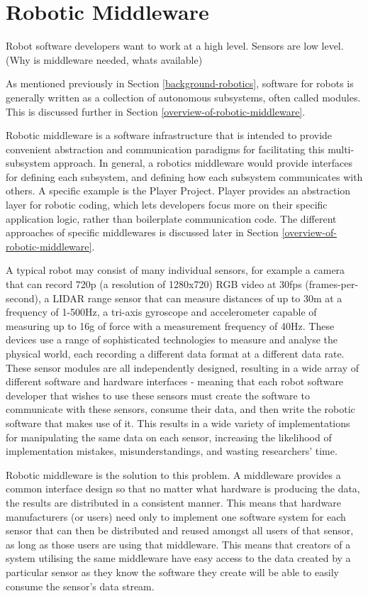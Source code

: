 \documentclass[../dissertation.tex]{subfiles}
\begin{document}
\section{Robotic Middleware}

Robot software developers want to work at a high level. Sensors are low level. (Why is middleware needed, whats available)

As mentioned previously in Section \ref{background-robotics}, software for robots is generally written as a collection of autonomous subsystems, often called modules. This is discussed further in Section \ref{overview-of-robotic-middleware}.

Robotic middleware is a software infrastructure that is intended to provide convenient abstraction and communication paradigms for facilitating this multi-subsystem approach. In general, a robotics middleware would provide interfaces for defining each subsystem, and defining how each subsystem communicates with others. A specific example is the Player Project. Player provides an abstraction layer for robotic coding, which lets developers focus more on their specific application logic, rather than boilerplate communication code\cite{vaughan2003device}. The different approaches of specific middlewares is discussed later in Section \ref{overview-of-robotic-middleware}.

A typical robot may consist of many individual sensors, for example a camera that can record 720p (a resolution of 1280x720) RGB video at 30fps (frames-per-second), a LIDAR range sensor that can measure distances of up to 30m at a frequency of 1-500Hz, a tri-axis gyroscope and accelerometer capable of measuring up to 16g of force with a measurement frequency of 40Hz. These devices use a range of sophisticated technologies to measure and analyse the physical world, each recording a different data format at a different data rate. These sensor modules are all independently designed, resulting in a wide array of different software and hardware interfaces - meaning that each robot software developer that wishes to use these sensors must create the software to communicate with these sensors, consume their data, and then write the robotic software that makes use of it. This results in a wide variety of implementations for manipulating the same data on each sensor, increasing the likelihood of implementation mistakes, misunderstandings, and wasting researchers' time.

Robotic middleware is the solution to this problem. A middleware provides a common interface design so that no matter what hardware is producing the data, the results are distributed in a consistent manner. This means that hardware manufacturers (or users) need only to implement one software system for each sensor that can then be distributed and reused amongst all users of that sensor, as long as those users are using that middleware. This means that creators of a  system utilising the same middleware have easy access to the data created by a particular sensor as they know the software they create will be able to easily consume the sensor's data stream.
\end{document}

